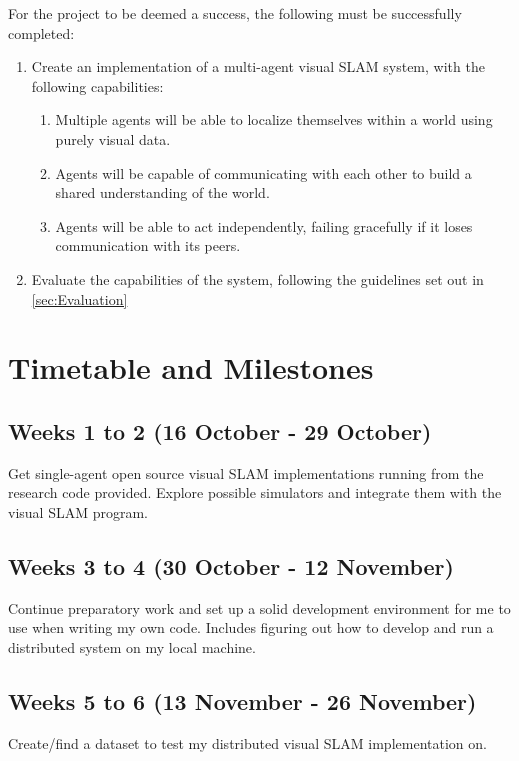 \documentclass[12pt,a4paper,twoside]{article}
\begin{document}
For the project to be deemed a success, the following must be successfully completed:

\begin{enumerate}
  \item Create an implementation of a multi-agent visual SLAM system, with the following capabilities:
    \begin{enumerate}
      \item Multiple agents will be able to localize themselves within a world using purely visual data.
      \item Agents will be capable of communicating with each other to build a shared understanding of the world. 
      \item Agents will be able to act independently, failing gracefully if it loses communication with its peers.
    \end{enumerate}
  \item Evaluate the capabilities of the system, following the guidelines set out in \autoref{sec:Evaluation}
\end{enumerate}

\newpage 

\section{Timetable and Milestones}

\subsection*{Weeks 1 to 2 (16 October - 29 October)}
Get single-agent open source visual SLAM implementations running from the research code provided. Explore possible simulators and integrate them with the visual SLAM program.

\subsection*{Weeks 3 to 4 (30 October - 12 November)}
Continue preparatory work and set up a solid development environment for me to use when writing my own code. Includes figuring out how to develop and run a distributed system on my local machine.

\subsection*{Weeks 5 to 6 (13 November - 26 November)}
Create/find a dataset to test my distributed visual SLAM implementation on. 
\end{document}
